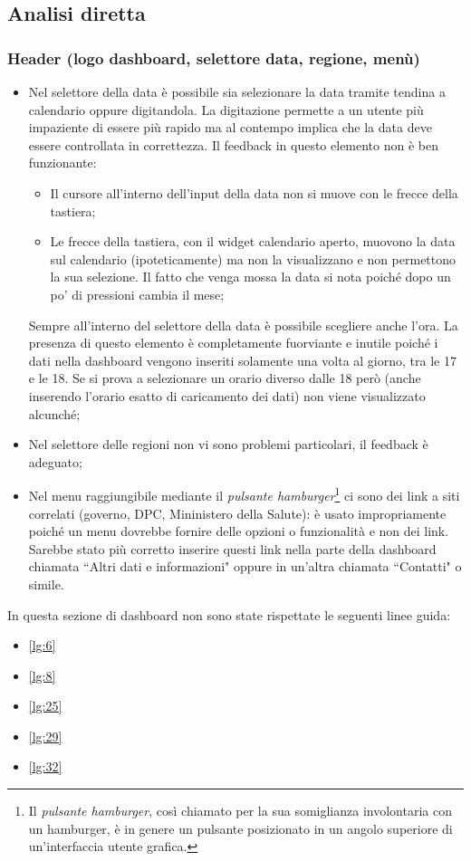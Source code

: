 \subsection{Analisi diretta}

\subsubsection{Header (logo dashboard, selettore data, regione, menù)}
\begin{itemize}
    \item Nel selettore della data è possibile sia selezionare la data tramite tendina a calendario oppure digitandola. La digitazione permette a un utente più impaziente di essere più rapido ma al contempo implica che la data deve essere controllata in correttezza. Il feedback in questo elemento non è ben funzionante:
    \begin{itemize}
        \item Il cursore all'interno dell'input della data non si muove con le frecce della tastiera;
        \item Le frecce della tastiera, con il widget calendario aperto, muovono la data sul calendario (ipoteticamente) ma non la visualizzano e non permettono la sua selezione. Il fatto che venga mossa la data si nota poiché dopo un po' di pressioni cambia il mese;
    \end{itemize}
    Sempre all'interno del selettore della data è possibile scegliere anche l'ora. La presenza di questo elemento è completamente fuorviante e inutile poiché i dati nella dashboard vengono inseriti solamente una volta al giorno, tra le 17 e le 18. Se  si prova a selezionare un orario diverso dalle 18 però (anche inserendo l'orario esatto di caricamento dei dati) non viene visualizzato alcunché;
    \item Nel selettore delle regioni non vi sono problemi particolari, il feedback è adeguato;
    \item Nel menu raggiungibile mediante il \textit{pulsante hamburger}\footnote{Il \textit{pulsante hamburger}, così chiamato per la sua somiglianza involontaria con un hamburger, è in genere un pulsante posizionato in un angolo superiore di un'interfaccia utente grafica. } ci sono dei link a siti correlati (governo, DPC, Mininistero della Salute): è usato impropriamente poiché un menu dovrebbe fornire delle opzioni o funzionalità e non dei link. Sarebbe stato più corretto inserire questi link nella parte della dashboard chiamata ``Altri dati e informazioni" oppure in un'altra chiamata ``Contatti" o simile.
\end{itemize}
In questa sezione di dashboard non sono state rispettate le seguenti linee guida:
\begin{itemize}
    \item \ref{lg:6}
    \item \ref{lg:8}
    \item \ref{lg:25}
    \item \ref{lg:29}
    \item \ref{lg:32}
\end{itemize}

